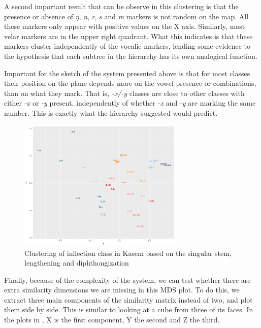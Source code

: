 A second important result that can be observe in this clustering is that the presence or absence of \textit{ŋ}, \textit{n}, \textit{r}, \textit{s} and \textit{m} markers is not random on the map. All these markers only appear with positive values on the X axis. Similarly, most velar markers are in the upper right quadrant. What this indicates is that these markers cluster independently of the vocalic markers, lending some evidence to the hypothesis that each subtree in the hierarchy has its own analogical function.

Important for the sketch of the system presented above is that for most classes their position on the plane depends more on the vowel presence or combinations, than on what they mark. That is, \textit{-x/-y} classes are close to other classes with either \textit{-x} or \textit{-y} present, independently of whether \textit{-x} and \textit{-y} are marking the same number. This is exactly what the hierarchy suggested would predict.

\begin{figure}
  \centering
  \includegraphics[width=0.7\textwidth]{./figures/kasem/kasem-nouns-hclust-sim-sg-pred.pdf}
  \caption{Clustering of inflection class in Kasem based on the singular stem, lengthening and diphthongization}\label{fig:class-cluster-kasem}
\end{figure}

Finally, because of the complexity of the system, we can test whether there are extra similarity dimensions we are missing in this MDS plot. To do this, we extract three main components of the similarity matrix instead of two, and plot them side by side. This is similar to looking at a cube from three of its faces. In the plots in , X is the first component, Y the second and Z the third.

